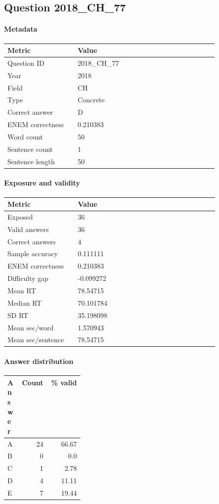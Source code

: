 \subsection*{Question 2018\_CH\_77}
\label{sec:q_2018_CH_77}
\paragraph{Metadata}
\begin{tabular}{p{0.30\linewidth}p{0.60\linewidth}}
\toprule
Metric & Value\\
\midrule
Question ID & 2018\_CH\_77\\
Year & 2018\\
Field & CH\\
Type & Concrete\\
Correct answer & D\\
ENEM correctness & 0.210383\\
Word count & 50\\
Sentence count & 1\\
Sentence length & 50\\
\bottomrule
\end{tabular}

\paragraph{Exposure and validity}
\begin{tabular}{p{0.30\linewidth}p{0.60\linewidth}}
\toprule
Metric & Value\\
\midrule
Exposed & 36\\
Valid answers & 36\\
Correct answers & 4\\
Sample accuracy & 0.111111\\
ENEM correctness & 0.210383\\
Difficulty gap & -0.099272\\
Mean RT & 78.54715\\
Median RT & 70.101784\\
SD RT & 35.198098\\
Mean sec/word & 1.570943\\
Mean sec/sentence & 78.54715\\
\bottomrule
\end{tabular}

\paragraph{Answer distribution}
\begin{tabular}{p{0.18\linewidth}rr}
\toprule
Answer & Count & \% valid\\
\midrule
A & 24 & 66.67\\
B & 0 & 0.0\\
C & 1 & 2.78\\
D & 4 & 11.11\\
E & 7 & 19.44\\
\bottomrule
\end{tabular}

